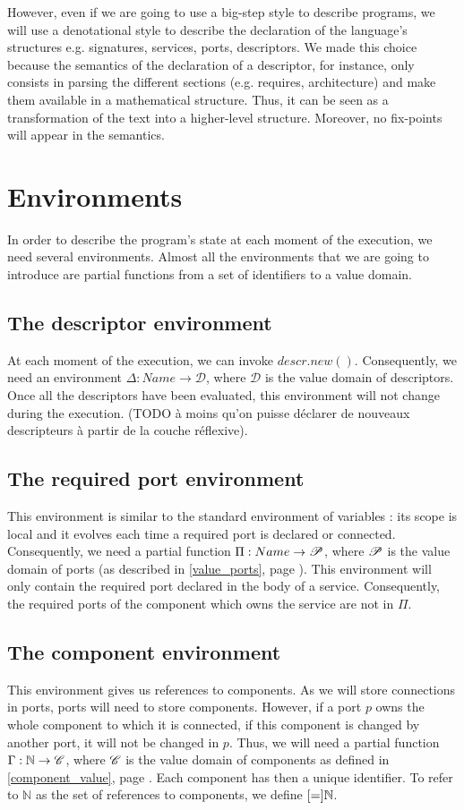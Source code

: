 However, even if we are going to use a big-step style to describe programs, we will use a denotational style to describe the declaration of the language's structures e.g. signatures, services, ports, descriptors. We made this choice because the semantics of the declaration of a descriptor, for instance, only consists in parsing the different sections (e.g. requires, architecture) and make them available in a mathematical structure. Thus, it can be seen as a transformation of the text into a higher-level structure. Moreover, no fix-points will appear in the semantics.



\section{Environments}
In order to describe the program's state at each moment of the execution, we need several environments. Almost all the environments that we are going to introduce are partial functions from a set of identifiers to a value domain.

\subsection{The descriptor environment}
At each moment of the execution, we can invoke $descr.new()$. Consequently, we need an environment  $\Delta : Name \rightarrow \mathcal{D}$, where $\mathcal{D}$ is the value domain of descriptors. Once all the descriptors have been evaluated, this environment will not change during the execution.
 (TODO à moins qu'on puisse déclarer de nouveaux descripteurs à partir de la couche réflexive).

\subsection{The required port environment}
This environment is similar to the standard environment of variables : its scope is local and it evolves each time a required port is declared or connected. Consequently, we need a partial function $\Pi : Name \rightarrow \mathcal{P}$, where $\mathcal{P}$ is the value domain of ports (as described in \ref{value_ports}, page \pageref{value_ports}). This environment will only contain the required port declared in the body of a service. Consequently, the required ports of the component which owns the service are not in $\Pi$.


\subsection{The component environment}
This environment gives us references to components. As we will store connections in ports, ports will need to store components. However, if a port $p$ owns the whole component to which it is connected, if this component is changed by another port, it will not be changed in $p$. Thus, we will need a partial function $\Gamma : \mathbb{N} \rightarrow \mathcal{C}$, where $\mathcal{C}$ is the value domain of components as defined in \ref{component_value}, page \pageref{component_value}. Each component has then a unique identifier. To refer to $\mathbb{N}$ as the set of references to components, we define $\Cref = \mathbb{N}$.

